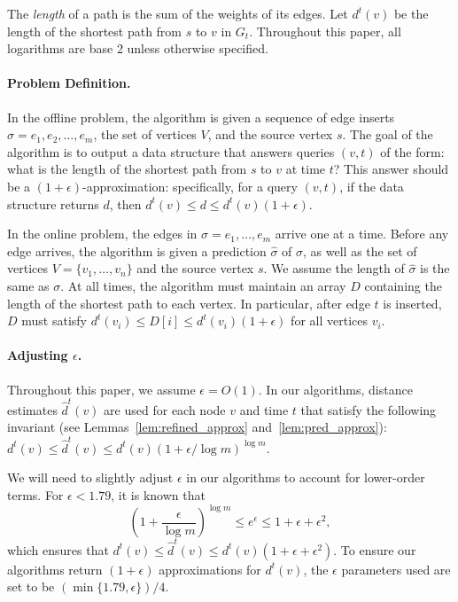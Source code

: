 \documentclass[11pt]{article}
\begin{document}
The \emph{length} of a path is the sum of the weights of its edges. 
Let $d^t(v)$ be the length of the shortest path from $s$ to $v$ in $G_t$. 
Throughout this paper, all logarithms are base 2 unless otherwise specified.

\paragraph{Problem Definition.}
In the offline problem, the algorithm is given a sequence of edge inserts $\sigma = e_1, e_2, \ldots, e_m$, the set of vertices $V$, and the source vertex $s$.  The goal of the algorithm is to output a data structure that answers queries $(v,t)$ of the form: what is the length of the shortest path from $s$ to $v$ at time $t$?  This answer should be a $(1 + \epsilon)$-approximation: specifically, for a query $(v, t)$, if the data structure returns $d$, then ${d}^t(v) \leq d \leq d^t(v)(1 + \epsilon)$.

In the online problem, the edges in $\sigma = e_1, \ldots, e_m$ arrive one at a time.  Before any edge arrives, the algorithm is given a prediction $\hat{\sigma}$ of $\sigma$, as well as the set of vertices $V=\{v_1,\ldots,v_n\}$ and the source vertex $s$.  
We assume the length of $\hat{\sigma}$ is the same as $\sigma$.
At all times, the algorithm must maintain an array $D$ containing the length of the shortest path to each vertex.  In particular, after edge $t$ is inserted, $D$ must satisfy $d^t(v_i)\leq D[i] \leq d^t(v_i)(1 + \epsilon)$ for all vertices $v_i$.

\paragraph{Adjusting $\epsilon$.}
Throughout this paper, we assume $\epsilon = O(1)$.
In our algorithms, distance estimates $\hat{d}^t(v)$ are used for each node $v$ and time $t$ that satisfy the following invariant (see Lemmas~\ref{lem:refined_approx} and~\ref{lem:pred_approx}):
$d^t(v) \leq \hat{d}^t(v) \leq d^t(v)(1 + \epsilon/ \log m)^{\log m}$.

We will need to slightly adjust $\epsilon$ in our algorithms to account for lower-order terms.
For $\epsilon<1.79$, it is known that
\[\left( 1 + \frac{\epsilon}{\log m}\right)^{\log m} \leq e^\epsilon \leq 1+\epsilon+\epsilon^2,\]
which ensures that $d^t(v) \leq \hat{d}^t(v) \leq d^t(v)(1 + \epsilon + \epsilon^2)$.
To ensure our algorithms return $(1+\epsilon)$ approximations for $d^t(v)$, the $\epsilon$ parameters used are set to be $(\min\{1.79,\epsilon\})/4$. 
\end{document}
